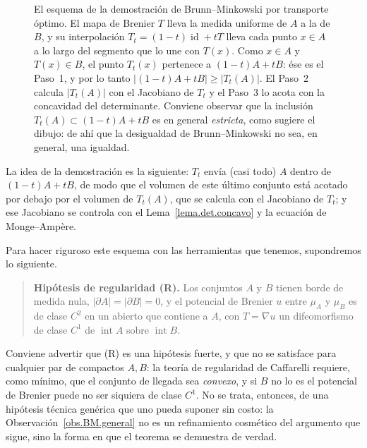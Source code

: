 \documentclass[12pt, a4paper]{amsbook}
\newcommand{\id}{\operatorname{id}}
\theoremstyle{remark}
\theoremstyle{definition}
\numberwithin{section}{chapter}
\numberwithin{subsection}{section}
\numberwithin{equation}{section}
\numberwithin{figure}{chapter}
\begin{document}
\begin{figure}[ht]
\caption{El esquema de la demostración de Brunn--Minkowski por transporte
óptimo. El mapa de Brenier $T$ lleva la medida uniforme de $A$ a la de $B$, y
su interpolación $T_t=(1-t)\id+tT$ lleva cada punto $x\in A$ a lo largo del
segmento que lo une con $T(x)$. Como $x\in A$ y $T(x)\in B$, el punto
$T_t(x)$ pertenece a $(1-t)A+tB$: ése es el Paso~1, y por lo tanto
$|(1-t)A+tB|\ge|T_t(A)|$. El Paso~2 calcula $|T_t(A)|$ con el Jacobiano de
$T_t$ y el Paso~3 lo acota con la concavidad del determinante. Conviene
observar que la inclusión $T_t(A)\subset(1-t)A+tB$ es en general
\emph{estricta}, como sugiere el dibujo: de ahí que la desigualdad de
Brunn--Minkowski no sea, en general, una igualdad.}
\label{fig.BM.transporte}
\end{figure}

La idea de la demostración es la siguiente: $T_t$ envía (casi todo) $A$
dentro de $(1-t)A+tB$, de modo que el volumen de este último conjunto está
acotado por debajo por el volumen de $T_t(A)$, que se calcula con el
Jacobiano de $T_t$; y ese Jacobiano se controla con el
Lema~\ref{lema.det.concavo} y la ecuación de Monge--Ampère.

Para hacer riguroso este esquema con las herramientas que tenemos,
supondremos lo siguiente.

\begin{quote}
\textbf{Hipótesis de regularidad (R).} Los conjuntos $A$ y $B$ tienen
borde de medida nula, $|\partial A|=|\partial B|=0$, y el potencial de
Brenier $u$ entre $\mu_A$ y $\mu_B$ es de clase $C^2$ en un abierto que
contiene a $A$, con $T=\nabla u$ un difeomorfismo de clase $C^1$ de
$\operatorname{int}A$ sobre $\operatorname{int}B$.
\end{quote}

Conviene advertir que (R) es una hipótesis fuerte, y que no se satisface para
cualquier par de compactos $A,B$: la teoría de regularidad de Caffarelli
requiere, como mínimo, que el conjunto de llegada sea \emph{convexo}, y si
$B$ no lo es el potencial de Brenier puede no ser siquiera de clase $C^1$.
No se trata, entonces, de una hipótesis técnica genérica que uno pueda
suponer sin costo: la Observación~\ref{obs.BM.general} no es un refinamiento
cosmético del argumento que sigue, sino la forma en que el teorema se
demuestra de verdad.
\end{document}
